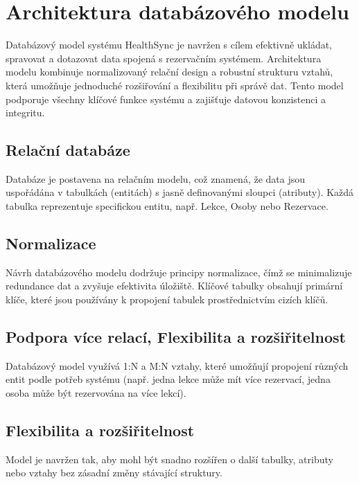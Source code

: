 \documentclass[12pt, a4paper,
openright
]{report}
\begin{document}
\section{Architektura databázového modelu}
\label{sec:zakladni_struktura}

Databázový model systému HealthSync je navržen s cílem efektivně ukládat, spravovat a dotazovat data spojená s rezervačním systémem. Architektura modelu kombinuje normalizovaný relační design a robustní strukturu vztahů, která umožňuje jednoduché rozšiřování a flexibilitu při správě dat. Tento model podporuje všechny klíčové funkce systému a zajišťuje datovou konzistenci a integritu.

\subsection{Relační databáze}
Databáze je postavena na relačním modelu, což znamená, že data jsou uspořádána v tabulkách (entitách) s jasně definovanými sloupci (atributy).
Každá tabulka reprezentuje specifickou entitu, např. Lekce, Osoby nebo Rezervace.

\subsection{Normalizace}
Návrh databázového modelu dodržuje principy normalizace, čímž se minimalizuje redundance dat a zvyšuje efektivita úložiště.
Klíčové tabulky obsahují primární klíče, které jsou používány k propojení tabulek prostřednictvím cizích klíčů. 

\subsection{Podpora více relací, Flexibilita a rozšiřitelnost}
Databázový model využívá 1:N a M:N vztahy, které umožňují propojení různých entit podle potřeb systému (např. jedna lekce může mít více rezervací, jedna osoba může být rezervována na více lekcí).


\subsection{Flexibilita a rozšiřitelnost}
Model je navržen tak, aby mohl být snadno rozšířen o další tabulky, atributy nebo vztahy bez zásadní změny stávající struktury.
\end{document}
